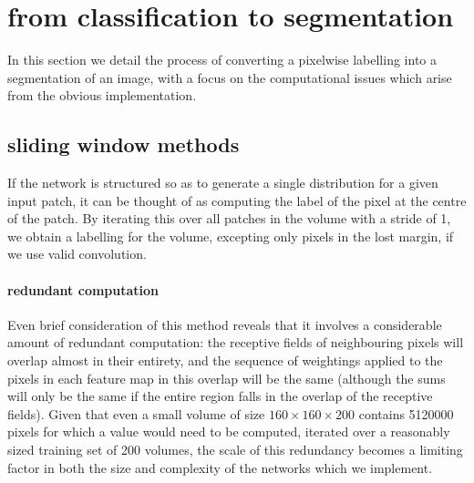 \documentclass[msc]{infthesis}
\begin{document}




\section{from classification to segmentation}
\label{sec:segmentation:sliding-window}

In this section we detail the process of converting a pixelwise labelling into a segmentation of an
image, with a focus on the computational issues which arise from the obvious implementation.


\subsection{sliding window methods}

If the network is structured so as to generate a single distribution for a given input patch, it
can be thought of as computing the label of the pixel at the centre of the patch.  By iterating this
over all patches in the volume with a stride of 1, we obtain a labelling for the volume, excepting
only pixels in the lost margin, if we use valid convolution.  


\paragraph*{redundant computation}
%
Even brief consideration of this method reveals that it involves a considerable amount of redundant
computation: the receptive fields of neighbouring pixels will overlap almost in their entirety, and
the sequence of weightings applied to the pixels in each feature map in this overlap will be the
same (although the sums will only be the same if the entire region falls in the overlap of the
receptive fields).  Given that even a small volume of size \(160 \times 160 \times 200\) contains
5120000 pixels for which a value would need to be computed, iterated over a reasonably sized training
set of 200 volumes, the scale of this redundancy becomes a
limiting factor in both the size and complexity of the networks which we implement.
\end{document}
